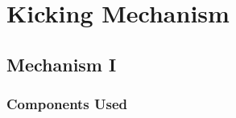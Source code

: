 
\section{Kicking Mechanism}

    \subsection{Mechanism I}
        \subsubsection{Components Used}

